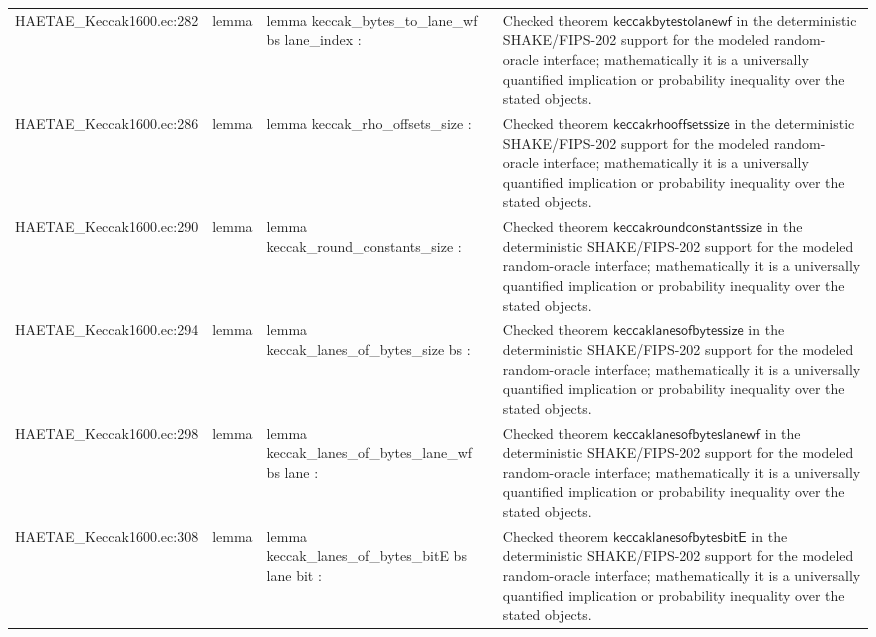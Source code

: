 \documentclass[10pt]{article}
\begin{document}
\begin{longtable}{L{0.11\textwidth}L{0.055\textwidth}L{0.385\textwidth}L{0.41\textwidth}}
HAETAE\_\allowbreak{}Keccak1600.\allowbreak{}ec:\allowbreak{}282 & lemma & {\ttfamily\scriptsize lemma keccak\_\allowbreak{}bytes\_\allowbreak{}to\_\allowbreak{}lane\_\allowbreak{}wf bs lane\_\allowbreak{}index :} & Checked theorem $\mathsf{keccakbytestolanewf}$ in the deterministic SHAKE/FIPS-202 support for the modeled random-oracle interface; mathematically it is a universally quantified implication or probability inequality over the stated objects. \\
HAETAE\_\allowbreak{}Keccak1600.\allowbreak{}ec:\allowbreak{}286 & lemma & {\ttfamily\scriptsize lemma keccak\_\allowbreak{}rho\_\allowbreak{}offsets\_\allowbreak{}size :} & Checked theorem $\mathsf{keccakrhooffsetssize}$ in the deterministic SHAKE/FIPS-202 support for the modeled random-oracle interface; mathematically it is a universally quantified implication or probability inequality over the stated objects. \\
HAETAE\_\allowbreak{}Keccak1600.\allowbreak{}ec:\allowbreak{}290 & lemma & {\ttfamily\scriptsize lemma keccak\_\allowbreak{}round\_\allowbreak{}constants\_\allowbreak{}size :} & Checked theorem $\mathsf{keccakroundconstantssize}$ in the deterministic SHAKE/FIPS-202 support for the modeled random-oracle interface; mathematically it is a universally quantified implication or probability inequality over the stated objects. \\
HAETAE\_\allowbreak{}Keccak1600.\allowbreak{}ec:\allowbreak{}294 & lemma & {\ttfamily\scriptsize lemma keccak\_\allowbreak{}lanes\_\allowbreak{}of\_\allowbreak{}bytes\_\allowbreak{}size bs :} & Checked theorem $\mathsf{keccaklanesofbytessize}$ in the deterministic SHAKE/FIPS-202 support for the modeled random-oracle interface; mathematically it is a universally quantified implication or probability inequality over the stated objects. \\
HAETAE\_\allowbreak{}Keccak1600.\allowbreak{}ec:\allowbreak{}298 & lemma & {\ttfamily\scriptsize lemma keccak\_\allowbreak{}lanes\_\allowbreak{}of\_\allowbreak{}bytes\_\allowbreak{}lane\_\allowbreak{}wf bs lane :} & Checked theorem $\mathsf{keccaklanesofbyteslanewf}$ in the deterministic SHAKE/FIPS-202 support for the modeled random-oracle interface; mathematically it is a universally quantified implication or probability inequality over the stated objects. \\
HAETAE\_\allowbreak{}Keccak1600.\allowbreak{}ec:\allowbreak{}308 & lemma & {\ttfamily\scriptsize lemma keccak\_\allowbreak{}lanes\_\allowbreak{}of\_\allowbreak{}bytes\_\allowbreak{}bitE bs lane bit :} & Checked theorem $\mathsf{keccaklanesofbytesbitE}$ in the deterministic SHAKE/FIPS-202 support for the modeled random-oracle interface; mathematically it is a universally quantified implication or probability inequality over the stated objects. \\

\end{longtable}
\end{document}
